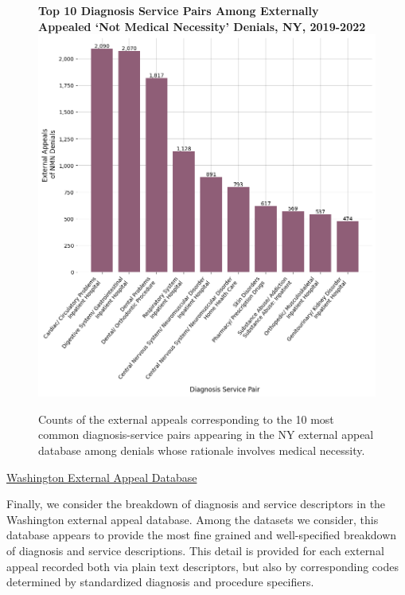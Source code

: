 \documentclass[12pt, a4paper,twoside]{report}
\theoremstyle{plain} %
\theoremstyle{definition} %
\theoremstyle{remark} %
\numberwithin{equation}{chapter}
\begin{document}
		\begin{figure}[h!]
			\centering
			\textbf{Top 10 Diagnosis Service Pairs Among Externally Appealed `Not Medical Necessity' Denials, NY, 2019-2022}
			\includegraphics[width=.8\textwidth]{images/nys_external/top_nmn_appeal_diag_service.png}
			\caption{Counts of the external appeals corresponding to the 10 most common diagnosis-service pairs appearing in the NY external appeal database among denials whose rationale involves medical necessity.}
			\label{nynmnexternalappealdiagservice}
		\end{figure}
	
		\underline{Washington External Appeal Database}
		
		Finally, we consider the breakdown of diagnosis and service descriptors in the Washington external appeal database. Among the datasets we consider, this database appears to provide the most fine grained and well-specified breakdown of diagnosis and service descriptions. This detail is provided for each external appeal recorded both via plain text descriptors, but also by corresponding codes determined by standardized diagnosis and procedure specifiers.
		
\end{document}
